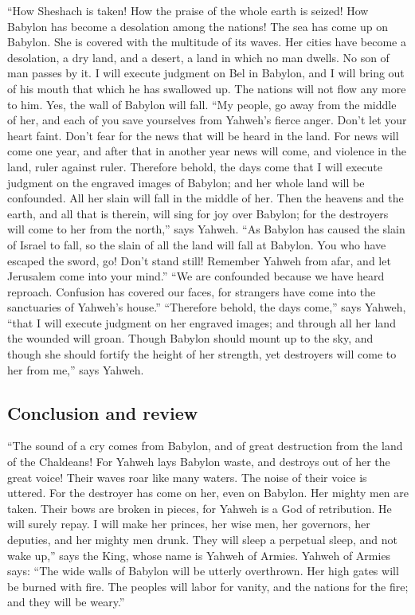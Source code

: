  ``How Sheshach is taken! How the praise of the whole
earth is seized! How Babylon has become a desolation among the nations!
 The sea has come up on Babylon. She is covered with the
multitude of its waves.  Her cities have become a
desolation, a dry land, and a desert, a land in which no man dwells. No
son of man passes by it.  I will execute judgment on Bel
in Babylon, and I will bring out of his mouth that which he has
swallowed up. The nations will not flow any more to him. Yes, the wall
of Babylon will fall.  ``My people, go away from the
middle of her, and each of you save yourselves from Yahweh's fierce
anger.  Don't let your heart faint. Don't fear for the
news that will be heard in the land. For news will come one year, and
after that in another year news will come, and violence in the land,
ruler against ruler.  Therefore behold, the days come
that I will execute judgment on the engraved images of Babylon; and her
whole land will be confounded. All her slain will fall in the middle of
her.  Then the heavens and the earth, and all that is
therein, will sing for joy over Babylon; for the destroyers will come to
her from the north,'' says Yahweh.  ``As Babylon has
caused the slain of Israel to fall, so the slain of all the land will
fall at Babylon.  You who have escaped the sword, go!
Don't stand still! Remember Yahweh from afar, and let Jerusalem come
into your mind.''  ``We are confounded because we have
heard reproach. Confusion has covered our faces, for strangers have come
into the sanctuaries of Yahweh's house.''  ``Therefore
behold, the days come,'' says Yahweh, ``that I will execute judgment on
her engraved images; and through all her land the wounded will groan.
 Though Babylon should mount up to the sky, and though
she should fortify the height of her strength, yet destroyers will come
to her from me,'' says Yahweh.

\hypertarget{conclusion-and-review}{%
\subsection{Conclusion and review}\label{conclusion-and-review}}

 ``The sound of a cry comes from Babylon, and of great
destruction from the land of the Chaldeans!  For Yahweh
lays Babylon waste, and destroys out of her the great voice! Their waves
roar like many waters. The noise of their voice is uttered.
 For the destroyer has come on her, even on Babylon. Her
mighty men are taken. Their bows are broken in pieces, for Yahweh is a
God of retribution. He will surely repay.  I will make
her princes, her wise men, her governors, her deputies, and her mighty
men drunk. They will sleep a perpetual sleep, and not wake up,'' says
the King, whose name is Yahweh of Armies.  Yahweh of
Armies says: ``The wide walls of Babylon will be utterly overthrown. Her
high gates will be burned with fire. The peoples will labor for vanity,
and the nations for the fire; and they will be weary.''

